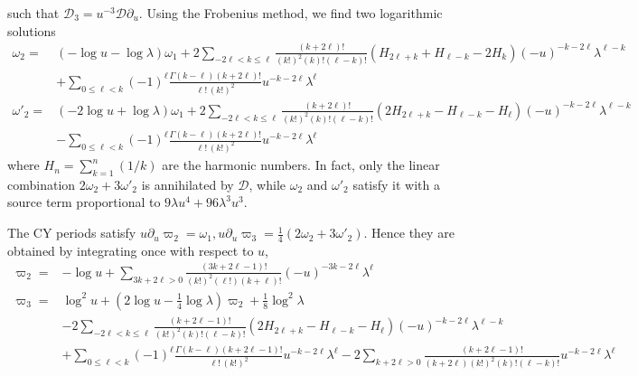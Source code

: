 \documentclass[11pt, a4paper]{article}
\numberwithin{equation}{section}
\begin{document}
such that $\mathcal{D}_3= u^{-3} \mathcal{D} \partial_u$. 
Using the Frobenius method, we find two logarithmic solutions
\begin{equation}
  \begin{aligned}
  \omega_2 =& (-\log u -\log\lambda) \omega_1 + 2  
  \sum_{-2\ell<k\leq \ell} 
  \frac{(k+2\ell)!}{(k!)^2 (k)! (\ell-k)!} 
  \left( H_{2\ell+k} + H_{\ell-k} - 2 H_{k} \right) 
 (-u)^{-k-2\ell} \lambda^{\ell-k} \\ & 
 + \sum_{0\leq \ell<k} (-1)^{\ell}  \frac{\Gamma(k-\ell) (k+2\ell)!}{\ell!\, (k!)^2} 
 u^{-k-2\ell} \lambda^{\ell} 
 \\
 \omega'_2 =& (-2\log u +\log\lambda) \omega_1 + 2  
  \sum_{-2\ell<k\leq \ell} 
  \frac{(k+2\ell)!}{(k!)^2 (k)! (\ell-k)!} 
  \left( 2H_{2\ell+k} - H_{\ell-k} -  H_{\ell} \right) 
 (-u)^{-k-2\ell} \lambda^{\ell-k}\\ & 
 - \sum_{0\leq \ell<k} (-1)^{\ell}  \frac{\Gamma(k-\ell) (k+2\ell)!}{\ell!\, (k!)^2} 
 u^{-k-2\ell} \lambda^{\ell} 
  \end{aligned}
\end{equation} 
where $H_n=\sum_{k=1}^n (1/k)$ are the harmonic numbers. In fact, only the linear combination $2\omega_2+3\omega'_2$ is annihilated by $\mathcal{D}$, while
$\omega_2$ and $\omega'_2$ satisfy it with a source term proportional to $9\lambda u^4 +96 \lambda^3 u^3$. 

The CY periods satisfy $u\partial_u \varpi_2=\omega_1, u\partial_u \varpi_3=\frac14(2\omega_2+3\omega'_2)$.
Hence they are obtained by integrating once with respect to $u$,
\begin{equation}
      \begin{aligned}
  \varpi_2 =& -\log u + 
  \sum_{3k+2\ell>0} \frac{(3k+2\ell-1)!}{(k!)^2 (\ell!)(k+\ell)!} 
  (-u)^{-3k-2\ell} \lambda^{\ell}  \\
  \varpi_3 =& \log^2 u + (2\log u - \frac14 \log \lambda) \varpi_2 + \frac18 \log^2\lambda 
  \\ &
-2  \sum_{-2\ell<k\leq \ell} 
  \frac{(k+2\ell-1)!}{(k!)^2 (k)! (\ell-k)!} 
  \left( 2H_{2\ell+k} - H_{\ell-k} -  H_{\ell} \right) 
 (-u)^{-k-2\ell} \lambda^{\ell-k}\\ & 
 + \sum_{0\leq \ell<k} (-1)^{\ell}  \frac{\Gamma(k-\ell) (k+2\ell-1)!}{\ell!\, (k!)^2} 
 u^{-k-2\ell} \lambda^{\ell} 
 -2 \sum_{k+2\ell>0}  \frac{(k+2\ell-1)!}{(k+2\ell)(k!)^2 (k)! (\ell-k)!} u^{-k-2\ell} \lambda^{\ell} 
  \end{aligned}
\end{equation}
\end{document}
